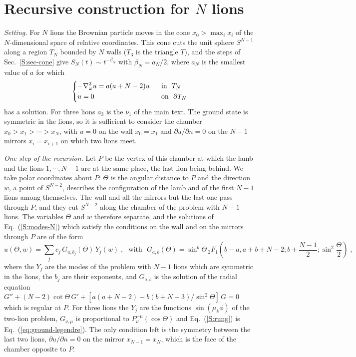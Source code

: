 \section{Recursive construction for $N$ lions} \label{S:sec-recursion}

\emph{Setting.} For $N$ lions the Brownian particle moves in the cone $x_0 > \max_i x_i$ of the $N$-dimensional space of relative coordinates. This cone cuts the unit sphere $S^{N-1}$ along a region $T_N$ bounded by $N$ walls ($T_3$ is the triangle $T$), and the steps of Sec.~\ref{S:sec-cone} give $S_N(t) \sim t^{-\beta_N}$ with $\beta_N = a_N/2$, where $a_N$ is the smallest value of $a$ for which
\begin{equation} \label{S:modes-N}
    \begin{dcases}
        - \laplacian_\omega u = a (a + N - 2) u &\mbox{~~in~~} T_N \\
        u = 0 &\mbox{~~on~~} \partial T_N
    \end{dcases}
\end{equation}
has a solution. For three lions $a_3$ is the $\nu_1$ of the main text. The ground state is symmetric in the lions, so it is sufficient to consider the chamber $x_0 > x_1 > \cdots > x_N$, with $u = 0$ on the wall $x_0 = x_1$ and $\partial u/\partial n = 0$ on the $N - 1$ mirrors $x_i = x_{i+1}$ on which two lions meet.

\emph{One step of the recursion.} Let $P$ be the vertex of this chamber at which the lamb and the lions $1, \cdots, N-1$ are at the same place, the last lion being behind. We take polar coordinates about $P$: $\Theta$ is the angular distance to $P$ and the direction $w$, a point of $S^{N-2}$, describes the configuration of the lamb and of the first $N - 1$ lions among themselves. The wall and all the mirrors but the last one pass through $P$, and they cut $S^{N-2}$ along the chamber of the problem with $N - 1$ lions. The variables $\Theta$ and $w$ therefore separate, and the solutions of Eq.~(\ref{S:modes-N}) which satisfy the conditions on the wall and on the mirrors through $P$ are of the form
\begin{equation} \label{S:rung}
    u(\Theta, w) = \sum_j c_j \, G_{a, b_j}(\Theta) \, Y_j(w) \;, \mbox{~~with~~} G_{a,b}(\Theta) = \sin^b \Theta \,_2F_1\left( b - a, a + b + N - 2 ; b + \frac{N-1}{2} ; \sin^2 \frac{\Theta}{2} \right) \;,
\end{equation}
where the $Y_j$ are the modes of the problem with $N - 1$ lions which are symmetric in the lions, the $b_j$ are their exponents, and $G_{a,b}$ is the solution of the radial equation $G'' + (N-2) \cot \Theta \, G' + [a (a + N - 2) - b (b + N - 3)/\sin^2 \Theta] \, G = 0$ which is regular at $P$. For three lions the $Y_j$ are the functions $\sin (\mu_k \phi)$ of the two-lion problem, $G_{\nu, \mu}$ is proportional to $P_\nu^{-\mu}(\cos \Theta)$ and Eq.~(\ref{S:rung}) is Eq.~(\ref{eq:ground-legendre}). The only condition left is the symmetry between the last two lions, $\partial u/\partial n = 0$ on the mirror $x_{N-1} = x_N$, which is the face of the chamber opposite to $P$.

